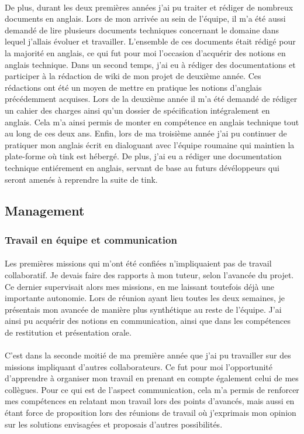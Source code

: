 \documentclass[12pt,a4paper]{report}
\begin{document}
\paragraph*{}De plus, durant les deux premières années j'ai pu traiter et rédiger de nombreux documents en anglais. Lors de mon arrivée au sein de l'équipe, il m'a été aussi demandé de lire plusieurs documents techniques concernant le domaine dans lequel j'allais évoluer et travailler. L'ensemble de ces documents était rédigé pour la majorité en anglais, ce qui fut pour moi l'occasion d'acquérir des notions en anglais technique. Dans un second temps, j'ai eu à rédiger des documentations et participer à la rédaction de wiki de mon projet de deuxième année. Ces rédactions ont été un moyen de mettre en pratique les notions d’anglais précédemment acquises. Lors de la deuxième année il m'a été demandé de rédiger un cahier des charges ainsi qu'un dossier de spécification intégralement en anglais. Cela m'a ainsi permis de monter en compétence en anglais technique tout au long de ces deux ans. Enfin, lors de ma troisième année j'ai pu continuer de pratiquer mon anglais écrit en dialoguant avec l'équipe roumaine qui maintien la plate-forme où \gls{tink} est hébergé. De plus, j'ai eu a rédiger une documentation technique entiérement en anglais, servant de base au futurs dévéloppeurs qui seront amenés à reprendre la suite de \gls{tink}.\\

\subsection{Management}
\subsubsection{Travail en équipe et communication}
\paragraph*{}Les premières missions qui m'ont été confiées n'impliquaient pas de travail collaboratif. Je devais faire des rapports à mon tuteur, selon l'avancée du projet. Ce dernier supervisait alors mes missions, en me laissant toutefois déjà une importante autonomie. Lors de réunion ayant lieu toutes les deux semaines, je présentais mon avancée de manière plus synthétique au reste de l'équipe. J'ai ainsi pu acquérir des notions en communication, ainsi que dans les compétences de restitution et présentation orale.
\paragraph*{}C'est dans la seconde moitié de ma première année que j'ai pu travailler sur des missions impliquant d'autres collaborateurs. Ce fut pour moi l'opportunité d'apprendre à organiser mon travail en prenant en compte également celui de mes collègues. Pour ce qui est de l'aspect communication, cela m'a permis de renforcer mes compétences en relatant mon travail lors des points d'avancés, mais aussi en étant force de proposition lors des réunions de travail où j'exprimais mon opinion sur les solutions envisagées et proposais d'autres possibilités.
\end{document}

